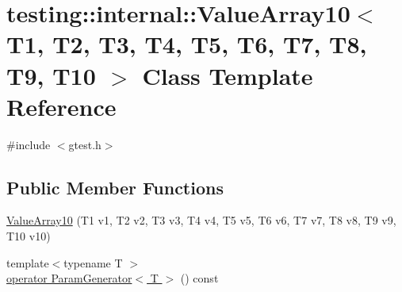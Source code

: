 \hypertarget{classtesting_1_1internal_1_1_value_array10}{\section{testing\-:\-:internal\-:\-:Value\-Array10$<$ T1, T2, T3, T4, T5, T6, T7, T8, T9, T10 $>$ Class Template Reference}
\label{classtesting_1_1internal_1_1_value_array10}
}


{\ttfamily \#include $<$gtest.\-h$>$}

\subsection*{Public Member Functions}
\begin{DoxyCompactItemize}
\item 
\hyperlink{classtesting_1_1internal_1_1_value_array10_a763527165bcd1d8e7c366f979b76736b}{Value\-Array10} (T1 v1, T2 v2, T3 v3, T4 v4, T5 v5, T6 v6, T7 v7, T8 v8, T9 v9, T10 v10)
\item 
{\footnotesize template$<$typename T $>$ }\\\hyperlink{classtesting_1_1internal_1_1_value_array10_a378f01ab44ce69eb6cb586b9194c9f9c}{operator Param\-Generator$<$ T $>$} () const 
\end{DoxyCompactItemize}


